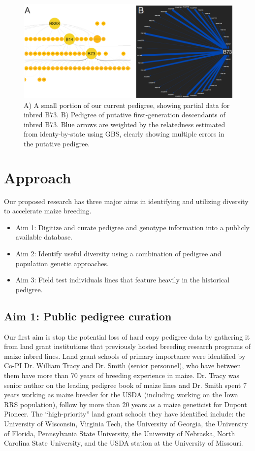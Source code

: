 \documentclass[12pt]{article}
\begin{document}
\begin{figure}
\includegraphics[width=1\linewidth]{crosby_combo}
\caption{A) A small portion of our current pedigree, showing partial data for inbred  B73. B) Pedigree of putative first-generation descendants of inbred B73. Blue arrows are weighted by the relatedness estimated from identy-by-state using GBS, clearly showing multiple errors in the putative pedigree.}
\label{fig:combo}
\end{figure}

\section*{Approach}
\label{sec:approach}
Our proposed research has three major aims in identifying and utilizing diversity to accelerate maize breeding.

\begin{itemize}
\item Aim 1: Digitize and curate pedigree and genotype information into a publicly available database. 
\item Aim 2: Identify useful diversity using a combination of pedigree and population genetic approaches.
\item Aim 3: Field test individuals lines that feature heavily in the historical pedigree.
\end{itemize}

\subsection*{Aim 1: Public pedigree curation}
Our first aim is stop the potential loss of hard copy pedigree data by gathering it from land grant institutions that previously hosted breeding research programs of maize inbred lines. 
Land grant schools of primary importance were identified by Co-PI Dr. William Tracy and  Dr. Smith (senior personnel), who have between them have more than 70 years of breeding experience in maize. 
Dr. Tracy was senior author on the leading pedigree book of maize lines \cite{gerdes1993compilation} and Dr. Smith spent 7 years working as maize breeder for the USDA (including working on the Iowa RRS population), follow by more than 20 years as a maize geneticist for Dupont Pioneer. The ``high-priority'' land grant schools they have identified include: the University of Wisconsin, Virginia Tech, the University of Georgia, the University of Florida, Pennsylvania State University, the University of Nebraska, North Carolina State University, and the USDA station at the University of Missouri. 
\end{document}
